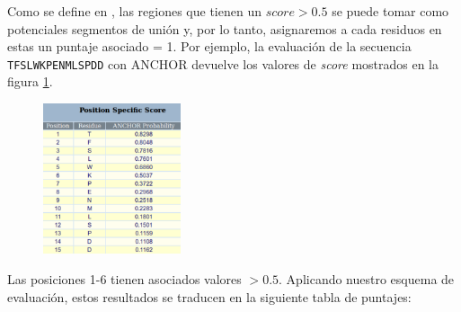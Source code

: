 Como se define en \cite{dosztanyi2009anchor}, las regiones que tienen un $score>0.5$ se puede tomar como potenciales segmentos de unión y, por lo tanto, asignaremos a cada residuos en estas un puntaje asociado = 1.
Por ejemplo, la evaluación de la secuencia \texttt{TFSLWKPENMLSPDD} con ANCHOR devuelve los valores de \textit{score} mostrados en la figura \ref{anchorResults}. 

\begin{figure}[ht]
\centering
\includegraphics[width=0.36\textwidth]{img/anchorTabla.png} 
\caption{}
\label{anchorResults}
\end{figure}

Las posiciones 1-6 tienen asociados valores $>0.5$. Aplicando nuestro esquema de evaluación, estos resultados se traducen en la siguiente tabla de puntajes:

